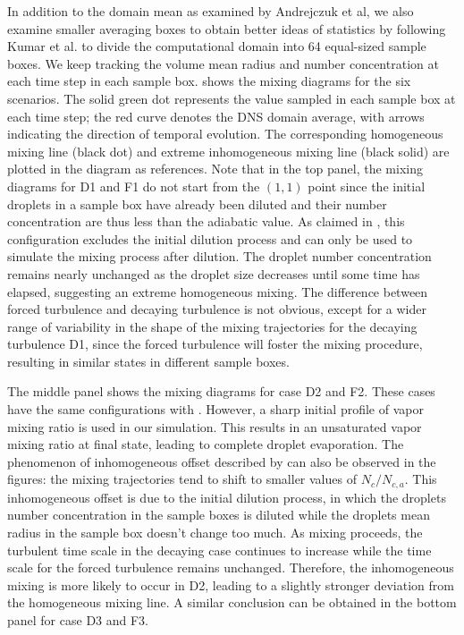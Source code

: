 \documentclass[draft,jgrga]{AGUTeX}
\begin{document}
\begin{article}
In addition to the domain mean as examined by Andrejczuk et al, we also examine smaller averaging boxes to obtain better ideas of statistics by following Kumar et al. \cite{Kumar14} to divide the computational domain into 64 equal-sized sample boxes. We keep tracking the volume mean radius and number concentration at each time step in each sample box.  shows the mixing diagrams for the six scenarios. The solid green dot represents the value sampled in each sample box at each time step; the red curve denotes the DNS domain average, with arrows indicating the direction of temporal evolution. The corresponding homogeneous mixing line (black dot) and extreme inhomogeneous mixing line (black solid) are plotted in the diagram as references. Note that in the top panel, the mixing diagrams for D1 and F1 do not start from the $(1,1)$ point since the initial droplets in a sample box have already been diluted and their number concentration are thus less than the adiabatic value. As claimed in \cite{And04}, this configuration excludes the initial dilution process and can only be used to simulate the mixing process after dilution. The droplet number concentration remains nearly unchanged as the droplet size decreases until some time has elapsed, suggesting an extreme homogeneous mixing. The difference between forced turbulence and decaying turbulence is not obvious, except for a wider range of variability in the shape of the mixing trajectories for the decaying turbulence D1, since the forced turbulence will foster the mixing procedure, resulting in similar states in different sample boxes. 

The middle panel shows the mixing diagrams for case D2 and F2. These cases have the same configurations with \cite{Kumar14}. However, a sharp initial profile of vapor mixing ratio is used in our simulation. This results in an unsaturated vapor mixing ratio at final state, leading to complete droplet evaporation. The phenomenon of inhomogeneous offset described by \cite{Kumar14} can also be observed in the figures: the mixing trajectories tend to shift to smaller values of $N_c/N_{c,a}$. This inhomogeneous offset is due to the initial dilution process, in which the droplets number concentration in the sample boxes is diluted while the droplets mean radius in the sample box doesn't change too much. As mixing proceeds, the turbulent time scale in the decaying case continues to increase while the time scale for the forced turbulence remains unchanged. Therefore, the inhomogeneous mixing is more likely to occur in D2, leading to a slightly stronger deviation from the homogeneous mixing line.  A similar conclusion can be obtained in the bottom panel for case D3 and F3. 


\end{article}
\end{document}
